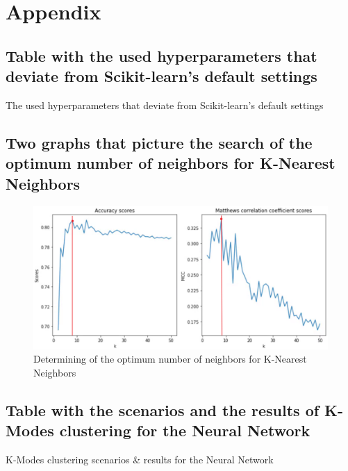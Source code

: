\section{Appendix}

\subsection{Table with the used hyperparameters that deviate from Scikit-learn's default settings}
\label{ssec:ushp}
\begin{table}[h]
\begin{footnotesize}

\end{footnotesize}
\caption{\label{tab:Hyperparameters} The used hyperparameters that deviate from Scikit-learn's default settings}
\end{table}

\subsection{Two graphs that picture the search of the optimum number of neighbors for K-Nearest Neighbors}
\label{ssec:fonn}
\begin{figure}[h]
    \centering
    \includegraphics[width=.7\linewidth]{ThesisTemplate/Images/KNN_n_neighbors.png}
    \caption{Determining of the optimum number of neighbors for K-Nearest Neighbors}
\end{figure}

\subsection{Table with the scenarios and the results of K-Modes clustering for the Neural Network}
\label{ssec:cluscen}
\begin{table}[H]
\begin{footnotesize}

\end{footnotesize}
\caption{\label{tab:clusc} K-Modes clustering scenarios \& results for the Neural Network}
\end{table}

